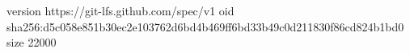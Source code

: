 version https://git-lfs.github.com/spec/v1
oid sha256:d5c058e851b30ec2e103762d6bd4b469ff6bd33b49c0d211830f86cd824b1bd0
size 22000
